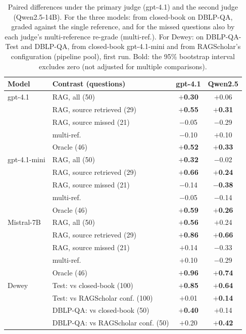\documentclass[conference]{IEEEtran}
\newcommand{\dq}{DBLP-QA}
\newcommand{\test}{DBLP-QA-Test}
\begin{document}
\begin{table}[t]
\caption{Paired differences under the primary judge (gpt-4.1) and the second judge (Qwen2.5-14B). For the
three models: from closed-book on \dq{}, graded against the single reference, and for the missed questions
also by each judge's multi-reference re-grade (multi-ref.). For Dewey: on \test{} and \dq{}, from
closed-book gpt-4.1-mini and from RAGScholar's configuration (pipeline pool), first run. Bold: the 95\% bootstrap
interval excludes zero (not adjusted for multiple comparisons).}
\label{tab:judges}
\centering\footnotesize
\setlength{\tabcolsep}{2.4pt}
\begin{tabular}{llcc}
\toprule
Model & Contrast (questions) & gpt-4.1 & Qwen2.5 \\
\midrule
gpt-4.1 & RAG, all (50) & \textbf{$+$0.30} & $+$0.06 \\
 & RAG, source retrieved (29) & \textbf{$+$0.55} & \textbf{$+$0.31} \\
 & RAG, source missed (21) & $-$0.05 & $-$0.29 \\
 & \quad multi-ref. & $-$0.10 & $+$0.10 \\
 & Oracle (46) & \textbf{$+$0.52} & \textbf{$+$0.33} \\
\midrule
gpt-4.1-mini & RAG, all (50) & \textbf{$+$0.32} & $-$0.02 \\
 & RAG, source retrieved (29) & \textbf{$+$0.66} & \textbf{$+$0.24} \\
 & RAG, source missed (21) & $-$0.14 & \textbf{$-$0.38} \\
 & \quad multi-ref. & $-$0.05 & $-$0.14 \\
 & Oracle (46) & \textbf{$+$0.59} & \textbf{$+$0.26} \\
\midrule
Mistral-7B & RAG, all (50) & \textbf{$+$0.56} & $+$0.24 \\
 & RAG, source retrieved (29) & \textbf{$+$0.86} & \textbf{$+$0.66} \\
 & RAG, source missed (21) & $+$0.14 & $-$0.33 \\
 & \quad multi-ref. & $+$0.10 & $-$0.29 \\
 & Oracle (46) & \textbf{$+$0.96} & \textbf{$+$0.74} \\
\midrule
Dewey & Test: vs closed-book (100) & \textbf{$+$0.85} & \textbf{$+$0.64} \\
 & Test: vs RAGScholar conf. (100) & $+$0.01 & \textbf{$+$0.14} \\
 & \dq{}: vs closed-book (50) & \textbf{$+$0.40} & $+$0.14 \\
 & \dq{}: vs RAGScholar conf. (50) & $+$0.20 & \textbf{$+$0.42} \\
\bottomrule
\end{tabular}
\end{table}
\end{document}

